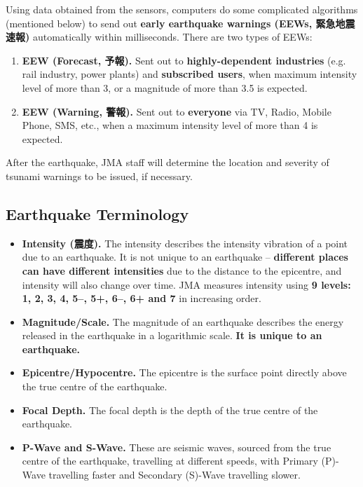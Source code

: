 Using data obtained from the sensors, computers do some complicated algorithms (mentioned below) to send out \textbf{early earthquake warnings (EEWs, 緊急地震速報)} automatically within milliseconds. There are two types of EEWs:
\begin{enumerate}
    \item \textbf{EEW (Forecast, 予報).} Sent out to \textbf{highly-dependent industries} (e.g. rail industry, power plants) and \textbf{subscribed users}, when maximum intensity level of more than 3, or a magnitude of more than 3.5 is expected.
    \item \textbf{EEW (Warning, 警報).} Sent out to \textbf{everyone} via TV, Radio, Mobile Phone, SMS, etc., when a maximum intensity level of more than 4 is expected.
\end{enumerate}

After the earthquake, JMA staff will determine the location and severity of tsunami warnings to be issued, if necessary.

\subsection{Earthquake Terminology}

\begin{itemize}
    \item \textbf{Intensity (震度).} The intensity describes the intensity vibration of a point due to an earthquake. It is not unique to an earthquake -- \textbf{different places can have different intensities} due to the distance to the epicentre, and intensity will also change over time. JMA measures intensity using \textbf{9 levels: 1, 2, 3, 4, 5--, 5+, 6--, 6+ and 7} in increasing order.
    \item \textbf{Magnitude/Scale.} The magnitude of an earthquake describes the energy released in the earthquake in a logarithmic scale. \textbf{It is unique to an earthquake.}
    \item \textbf{Epicentre/Hypocentre.} The epicentre is the surface point directly above the true centre of the earthquake.
    \item \textbf{Focal Depth.} The focal depth is the depth of the true centre of the earthquake.
    \item \textbf{P-Wave and S-Wave.} These are seismic waves, sourced from the true centre of the earthquake, travelling at different speeds, with Primary (P)-Wave travelling faster and Secondary (S)-Wave travelling slower.
\end{itemize}

